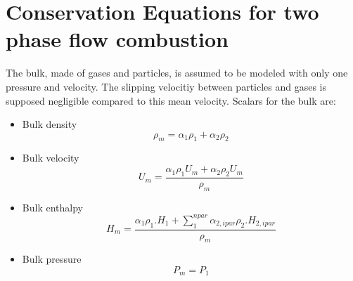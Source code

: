 
\section[Conservation Equations]{Conservation Equations for two phase flow combustion}

The bulk, made of gases and particles, is assumed to be modeled with only one pressure and velocity. The slipping velocitiy between particles 
and gases is supposed negligible compared to this mean velocity.
Scalars for the bulk are:
\vspace{0.5cm}
\begin{itemize}
  \item Bulk density 
     \begin{equation} 
        \rho_{m} = \alpha_{1}\rho_{1} + \alpha_{2}\rho_{2}
     \end{equation} 

  \item Bulk velocity 
     \begin{equation} 
       U_{m} = \frac{ \alpha_{1}\rho_{1} U_{m} 
                    + \alpha_{2}\rho_{2} U_{m} }{\rho_{m}}
     \end{equation}

  \item Bulk enthalpy 
     \begin{equation} 
        H_{m} = \frac{ \alpha_{1}\rho_{1}.H_{1} 
                     + \sum_{1}^{npar}\alpha_{2,ipar}\rho_{2}.H_{2,ipar} }{\rho_{m}}
     \end{equation} 

  \item Bulk pressure 
     \begin{equation} 
       P_{m} = P_{1}
     \end{equation}
\end{itemize}

